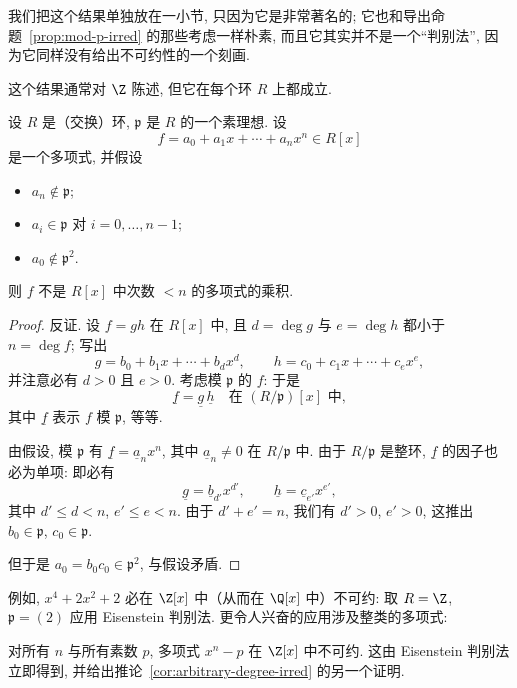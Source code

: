 我们把这个结果单独放在一小节, 只因为它是非常著名的; 它也和导出命题~\ref{prop:mod-p-irred} 的那些考虑一样朴素, 而且它其实并不是一个``判别法'', 因为它同样没有给出不可约性的一个刻画.

这个结果通常对 $\Z$ 陈述, 但它在每个环 $R$ 上都成立.

\begin{proposition}\label{prop:eisenstein}
设 $R$ 是（交换）环, $\mathfrak{p}$ 是 $R$ 的一个素理想. 设
\[
f=a_0+a_1x+\cdots+a_nx^n\in R[x]
\]
是一个多项式, 并假设
\begin{itemize}
\item $a_n\notin\mathfrak{p}$;
\item $a_i\in\mathfrak{p}$ 对 $i=0,\ldots,n-1$;
\item $a_0\notin\mathfrak{p}^2$.
\end{itemize}
则 $f$ 不是 $R[x]$ 中次数 $<n$ 的多项式的乘积.
\end{proposition}

\begin{proof}
反证. 设 $f=gh$ 在 $R[x]$ 中, 且 $d=\deg g$ 与 $e=\deg h$ 都小于 $n=\deg f$; 写出
\[
g=b_0+b_1x+\cdots+b_dx^d,\qquad h=c_0+c_1x+\cdots+c_ex^e,
\]
并注意必有 $d>0$ 且 $e>0$. 考虑模 $\mathfrak{p}$ 的 $f$: 于是
\[
\underline{f}=\underline{g}\,\underline{h}\quad\text{在 }(R/\mathfrak{p})[x]\text{ 中},
\]
其中 $\underline{f}$ 表示 $f$ 模 $\mathfrak{p}$, 等等.

由假设, 模 $\mathfrak{p}$ 有 $\underline{f}=\underline{a}_nx^n$, 其中 $\underline{a}_n\neq 0$ 在 $R/\mathfrak{p}$ 中. 由于 $R/\mathfrak{p}$ 是整环, $\underline{f}$ 的因子也必为单项: 即必有
\[
\underline{g}=\underline{b}_{d'}x^{d'},\qquad \underline{h}=\underline{c}_{e'}x^{e'},
\]
其中 $d'\le d < n$, $e'\le e < n$. 由于 $d'+e'=n$, 我们有 $d'>0$, $e'>0$, 这推出 $b_0\in\mathfrak{p}$, $c_0\in\mathfrak{p}$.

但于是 $a_0=b_0c_0\in\mathfrak{p}^2$, 与假设矛盾.
\end{proof}

例如, $x^4+2x^2+2$ 必在 $\Z[x]$ 中（从而在 $\Q[x]$ 中）不可约: 取 $R=\Z$, $\mathfrak{p}=(2)$ 应用 Eisenstein 判别法. 更令人兴奋的应用涉及整类的多项式:

\begin{example}\label{ex:xn-minus-p}
对所有 $n$ 与所有素数 $p$, 多项式 $x^n-p$ 在 $\Z[x]$ 中不可约. 这由 Eisenstein 判别法立即得到, 并给出推论~\ref{cor:arbitrary-degree-irred} 的另一个证明.
\end{example}

